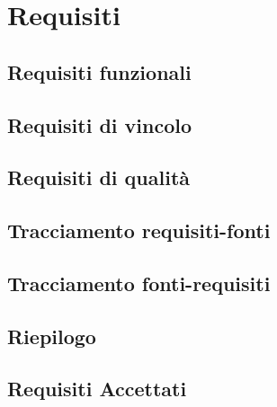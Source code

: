\section{Requisiti}
\subsection{Requisiti funzionali}
\subsection{Requisiti di vincolo}
\subsection{Requisiti di qualità}
\subsection{Tracciamento requisiti-fonti}
\subsection{Tracciamento fonti-requisiti}
\subsection{Riepilogo}
\subsection{Requisiti Accettati}